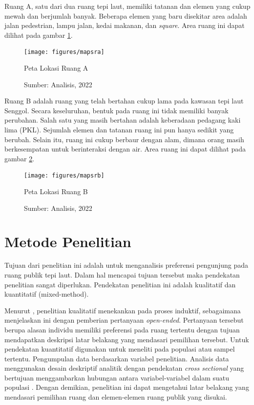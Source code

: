 \documentclass[11pt]{simart} %
\begin{document}
Ruang A, satu dari dua ruang tepi laut, memiliki tatanan dan elemen yang cukup mewah dan berjumlah banyak.
Beberapa elemen yang baru disekitar area adalah jalan pedestrian, lampu jalan, kedai makanan, dan \textit{square}. Area ruang ini dapat dilihat pada gambar \ref{fig:mapsra}.

\begin{figure}[ht]
    \centering
    \texttt{[image: figures/mapsra]}
    \caption{Peta Lokasi Ruang A}
    \caption*{Sumber: Analisis, 2022}
    \label{fig:mapsra}
\end{figure}

Ruang B adalah ruang yang telah bertahan cukup lama pada kawasan tepi laut Senggol.
Secara keseluruhan, bentuk pada ruang ini tidak memiliki banyak perubahan.
Salah satu yang masih bertahan adalah keberadaan pedagang kaki lima (PKL).
Sejumlah elemen dan tatanan ruang ini pun hanya sedikit yang berubah. Selain itu, ruang ini cukup berbaur dengan alam, dimana orang masih berkesempatan untuk berinteraksi dengan air.
Area ruang ini dapat dilihat pada gambar \ref{fig:mapsrb}.

\begin{figure}[ht]
    \centering
    \texttt{[image: figures/mapsrb]}
    \caption{Peta Lokasi Ruang B}
    \caption*{Sumber: Analisis, 2022}
    \label{fig:mapsrb}
\end{figure}

\section{Metode Penelitian}

Tujuan dari penelitian ini adalah untuk menganalisis preferensi pengunjung pada ruang publik tepi laut.
Dalam hal mencapai tujuan tersebut maka pendekatan penelitian sangat diperlukan. Pendekatan penelitian ini adalah kualitatif dan kuantitatif (mixed-method).

Menurut \cite{groat2013}, penelitian kualitatif menekankan  pada proses induktif, sebagaimana \citeauthor{creswell2016} menjelaskan ini dengan pemberian pertanyaan \textit{open-ended}. Pertanyaan tersebut berupa alasan individu memiliki preferensi pada ruang tertentu dengan tujuan mendapatkan deskripsi latar belakang yang mendasari pemilihan tersebut.
Untuk pendekatan kuantitatif digunakan untuk meneliti pada populasi atau sampel tertentu. Pengumpulan data berdasarkan variabel penelitian. Analisis data menggunakan desain deskriptif analitik dengan pendekatan \textit{cross sectional} yang bertujuan menggambarkan hubungan antara variabel-variabel dalam suatu populasi \citep{nurdini2006}. Dengan demikian, penelitian ini dapat mengetahui latar belakang yang mendasari pemilihan ruang dan elemen-elemen ruang publik yang disukai.
\end{document}
